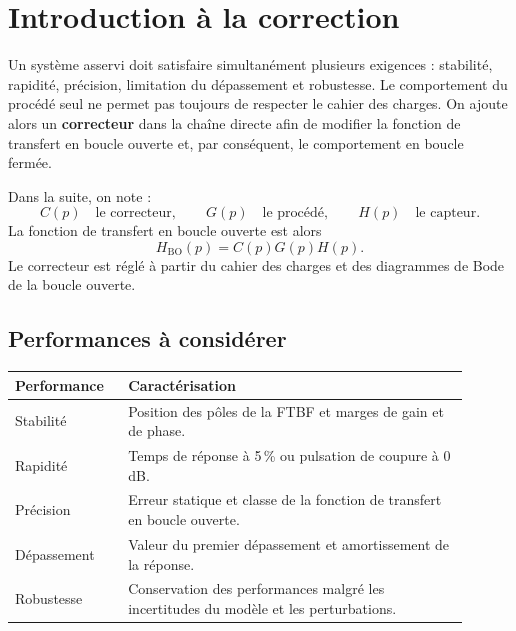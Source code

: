 
\section{Introduction à la correction}\label{sec:corr-introduction}

Un système asservi doit satisfaire simultanément plusieurs exigences : stabilité,
rapidité, précision, limitation du dépassement et robustesse. Le comportement du
procédé seul ne permet pas toujours de respecter le cahier des charges. On ajoute
alors un \textbf{correcteur} dans la chaîne directe afin de modifier la fonction de
transfert en boucle ouverte et, par conséquent, le comportement en boucle fermée.

\TLCorrecteurSerie

Dans la suite, on note :
\[
C(p)\quad\text{le correcteur},\qquad G(p)\quad\text{le procédé},\qquad
H(p)\quad\text{le capteur}.
\]
La fonction de transfert en boucle ouverte est alors
\[
H_{\mathrm{BO}}(p)=C(p)G(p)H(p).
\]
Le correcteur est réglé à partir du cahier des charges et des diagrammes de Bode de
la boucle ouverte.

\subsection{Performances à considérer}

\begin{center}
\renewcommand{\arraystretch}{1.25}
\begin{tabular}{|p{0.22\linewidth}|p{0.68\linewidth}|}
\hline
\textbf{Performance} & \textbf{Caractérisation} \\
\hline
Stabilité & Position des pôles de la FTBF et marges de gain et de phase. \\
\hline
Rapidité & Temps de réponse à 5\,\% ou pulsation de coupure à 0\,dB. \\
\hline
Précision & Erreur statique et classe de la fonction de transfert en boucle ouverte. \\
\hline
Dépassement & Valeur du premier dépassement et amortissement de la réponse. \\
\hline
Robustesse & Conservation des performances malgré les incertitudes du modèle et les perturbations. \\
\hline
\end{tabular}
\end{center}

